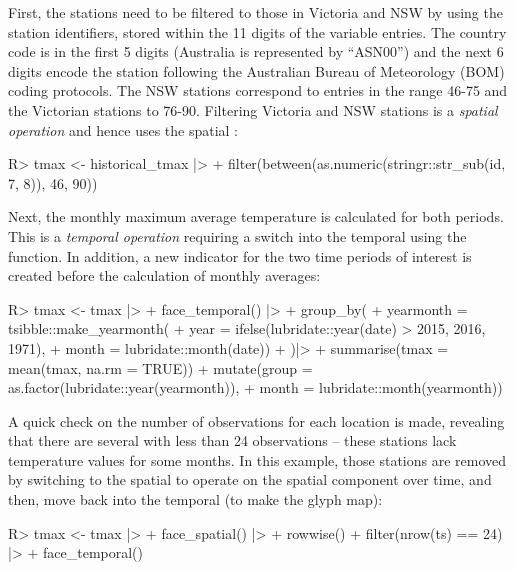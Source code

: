 \documentclass[
  shortnames]{jss}
\begin{document}
First, the stations need to be filtered to those in Victoria and NSW by using the station identifiers, stored within the 11 digits of the  variable entries. The country code is in the first 5 digits (Australia is represented by ``ASN00'') and the next 6 digits encode the station following the Australian Bureau of Meteorology (BOM) \citep{bom} coding protocols. The NSW stations correspond to entries in the range 46-75 and the Victorian stations to 76-90. Filtering Victoria and NSW stations is a \emph{spatial operation} and hence uses the spatial :

\begin{CodeChunk}
\begin{CodeInput}
R> tmax <- historical_tmax |>
+   filter(between(as.numeric(stringr::str_sub(id, 7, 8)), 46, 90))
\end{CodeInput}
\end{CodeChunk}

Next, the monthly maximum average temperature is calculated for both periods. This is a \emph{temporal operation} requiring a switch into the temporal  using the  function. In addition, a new indicator for the two time periods of interest is created before the calculation of monthly averages:

\begin{CodeChunk}
\begin{CodeInput}
R> tmax <- tmax |>
+   face_temporal() |> 
+   group_by(
+     yearmonth = tsibble::make_yearmonth(
+       year = ifelse(lubridate::year(date) > 2015, 2016, 1971),
+       month = lubridate::month(date))
+       )|>
+   summarise(tmax = mean(tmax, na.rm = TRUE)) %
+   mutate(group = as.factor(lubridate::year(yearmonth)),
+          month = lubridate::month(yearmonth))
\end{CodeInput}
\end{CodeChunk}

A quick check on the number of observations for each location is made, revealing that there are several with less than 24 observations -- these stations lack temperature values for some months. In this example, those stations are removed by switching to the spatial  to operate on the spatial component over time, and then, move back into the temporal  (to make the glyph map):

\begin{CodeChunk}
\begin{CodeInput}
R> tmax <- tmax |> 
+   face_spatial() |> 
+   rowwise() %
+   filter(nrow(ts) == 24) |>
+   face_temporal()
\end{CodeInput}
\end{CodeChunk}
\end{document}
